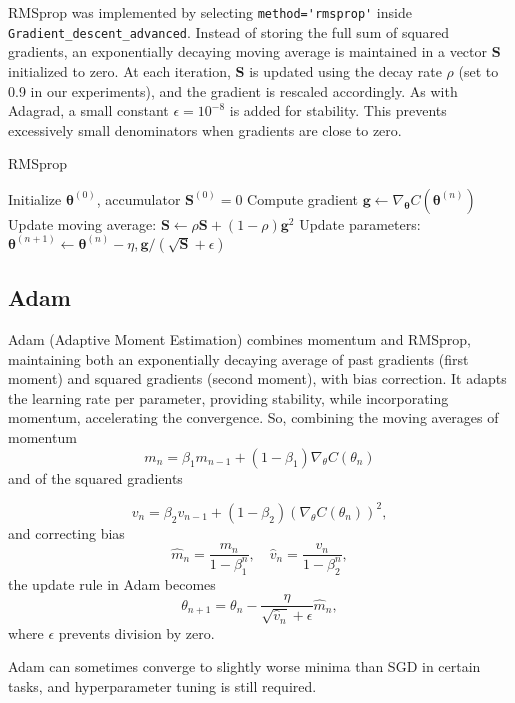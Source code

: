 \documentclass[
    article
 reprint,            %
 amsmath,amssymb,
 aps,
]{revtex4-2}
\begin{document}
RMSprop was implemented by selecting \verb|method='rmsprop'| inside \verb|Gradient_descent_advanced|. Instead of storing the full sum of squared gradients, an exponentially decaying moving average is maintained in a vector $\mathbf{S}$ initialized to zero. At each iteration, $\mathbf{S}$ is updated using the decay rate $\rho$ (set to 0.9 in our experiments), and the gradient is rescaled accordingly.
As with Adagrad, a small constant $\epsilon=10^{-8}$ is added for stability. This prevents excessively small denominators when gradients are close to zero.
\begin{algorithm}[H]
\caption{RMSprop}
\begin{algorithmic}[1]
\State Initialize $\boldsymbol{\theta}^{(0)}$, accumulator $\mathbf{S}^{(0)}=0$
\State Compute gradient $\mathbf{g} \gets \nabla_{\boldsymbol{\theta}} C(\boldsymbol{\theta}^{(n)})$
\State Update moving average: $\mathbf{S} \gets \rho \mathbf{S} + (1-\rho)\mathbf{g}^2$
\State Update parameters: $\boldsymbol{\theta}^{(n+1)} \gets \boldsymbol{\theta}^{(n)} - \eta , \mathbf{g} / (\sqrt{\mathbf{S}}+\epsilon)$
\EndFor
\end{algorithmic}
\end{algorithm}

\subsection{Adam}

Adam (Adaptive Moment Estimation) combines momentum and RMSprop, maintaining both an exponentially decaying average of past gradients (first moment) and squared gradients (second moment), with bias correction\cite{hjorthjensen_week37}. It adapts the learning rate per parameter, providing stability, while incorporating momentum, accelerating the convergence.
So, combining the moving averages of momentum
\[
m_n = \beta_1 m_{n-1} + (1-\beta_1) \nabla_\theta C(\theta_n)
\]  
and of the squared gradients

\[
v_n = \beta_2 v_{n-1} + (1-\beta_2) (\nabla_\theta C(\theta_n))^2,
\]  
and correcting bias
\[
\hat{m}_n = \frac{m_n}{1-\beta_1^n}, \quad \hat{v}_n = \frac{v_n}{1-\beta_2^n},
\]  
the update rule in Adam becomes
\[
\theta_{n+1} = \theta_n - \frac{\eta}{\sqrt{\hat{v}_n}+\epsilon} \hat{m}_n,
\]  
where \(\epsilon\) prevents division by zero.

Adam can sometimes converge to slightly worse minima than SGD in certain tasks, and hyperparameter tuning is still required. \cite{goodfellow2016}
\end{document}
